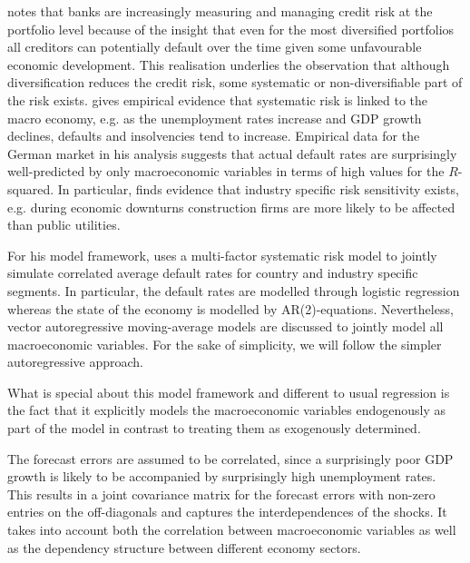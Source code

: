 \documentclass[a4paper, 11pt]{scrreprt}
\begin{document}
\textcite{wilson1998portfolio} notes that banks are increasingly measuring and managing credit risk at the portfolio level because of the insight that even for the most diversified portfolios all creditors can potentially default over the time given some unfavourable economic development. This realisation underlies the observation that although diversification reduces the credit risk, some systematic or non-diversifiable part of the risk exists. \textcite[chapter 3.3]{wilson1998measuring} gives empirical evidence that systematic risk is linked to the macro economy, e.g. as the unemployment rates increase and GDP growth declines, defaults and insolvencies tend to increase. Empirical data for the German market in his analysis suggests that actual default rates are surprisingly well-predicted by only macroeconomic variables in terms of high values for the $R$-squared. In particular, \textcite[chapter 3.4]{wilson1998measuring} finds evidence that industry specific risk sensitivity exists, e.g. during economic downturns construction firms are more likely to be affected than public utilities. 

For his model framework, \textcite{wilson1997wilsonI} uses a multi-factor systematic risk model to jointly simulate correlated average default rates for country and industry specific segments. In particular, the default rates are modelled through logistic regression whereas the state of the economy is modelled by AR(2)-equations. Nevertheless, vector \linebreak autoregressive moving-average models are discussed to jointly model all macroeconomic variables. For the sake of simplicity, we will follow the simpler autoregressive approach.

What is special about this model framework and different to usual regression is the fact that it explicitly models the macroeconomic variables endogenously as part of the model in contrast to treating them as exogenously determined.

The forecast errors are assumed to be correlated, since a surprisingly poor GDP growth is likely to be accompanied by surprisingly high unemployment rates. This results in a joint covariance matrix for the forecast errors with non-zero entries on the off-diagonals and captures the interdependences of the shocks. It takes into account both the correlation between macroeconomic variables as well as the dependency structure between different economy sectors.
\end{document}
